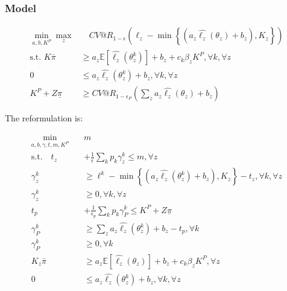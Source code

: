 \documentclass[11pt]{article}
\begin{document}
    \subsubsection*{Model}
    
    \begin{align}
        \min_{a,b,K^P} \max_z &\quad CV@R_{1-\epsilon}(\ell_z - \min\left\{(a_z\hat{\ell_z}(\theta_z) + b_z), K_z\right\})\\
        \text{s.t.   } K\bar{\pi} &\geq a_z \mathbb{E}[\hat{\ell_z}(\theta^k_z)] + b_z + c_k\beta_z K^P,  \forall k, \forall z\\
        0 &\leq a_z\hat{\ell_z}(\theta^k_z) + b_z, \forall k, \forall z \\
        K^P + Z\underline{\pi} &\geq CV@R_{1-\epsilon_P}\left( \sum_z a_z \hat{\ell_z}(\theta_z) + b_z \right)
    \end{align}
    
    The reformulation is: 
    
    \begin{align}
        \min_{a,b,\gamma,t,m,K^P} \quad & m\\
        \text{s.t.} \quad t_z &+ \frac{1}{\epsilon} \sum_k p_k \gamma_z^k \leq m, \forall z\\
        \gamma_z^k &\geq \ell^k - \min\left\{(a_z\hat{\ell_z}(\theta_z^k) + b_z), K_z\right\} -t_z, \forall k, \forall z \\
        \gamma_z^k &\geq 0, \forall k, \forall z\\
        t_p &+ \frac{1}{\epsilon_p} \sum_k p_k \gamma_P^k \leq K^P+Z\underline{\pi}\\
        \gamma_P^k &\geq \sum_z a_z \hat{\ell_z}(\theta^k_z) + b_z -t_p, \forall k \\
        \gamma_P^k &\geq 0, \forall k\\
        K_z\bar{\pi} &\geq a_z \mathbb{E}[\hat{\ell_z}(\theta_z)] + b_z + c_k \beta_z K^P, \forall z \\
        0 &\leq a_z \hat{\ell_z}(\theta_z^k) + b_z, \forall k, \forall z
    \end{align}


\end{document}
